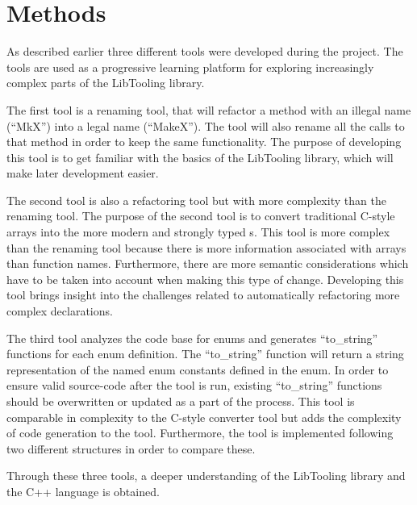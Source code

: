 \section{Methods}
As described earlier three different tools were developed during the project. The tools are used as a progressive learning platform for exploring increasingly complex parts of the LibTooling library. 

The first tool is a renaming tool, that will refactor a method with an illegal name (``MkX'') into a legal name (``MakeX''). The tool will also rename all the calls to that method in order to keep the same functionality. The purpose of developing this tool is to get familiar with the basics of the LibTooling library, which will make later development easier. 

The second tool is also a refactoring tool but with more complexity than the renaming tool. The purpose of the second tool is to convert traditional C-style arrays into the more modern and strongly typed s. This tool is more complex than the renaming tool because there is more information associated with arrays than function names. Furthermore, there are more semantic considerations which have to be taken into account when making this type of change.
Developing this tool brings insight into the challenges related to automatically refactoring more complex declarations.

The third tool analyzes the code base for enums and generates ``to\_string'' functions for each enum definition. The ``to\_string'' function will return a string representation of the named enum constants defined in the enum. In order to ensure valid source-code after the tool is run, existing ``to\_string'' functions should be overwritten or updated as a part of the process. 
This tool is comparable in complexity to the C-style converter tool but adds the complexity of code generation to the tool.
Furthermore, the tool is implemented following two different structures in order to compare these.

Through these three tools, a deeper understanding of the LibTooling library and the C++ language is obtained.